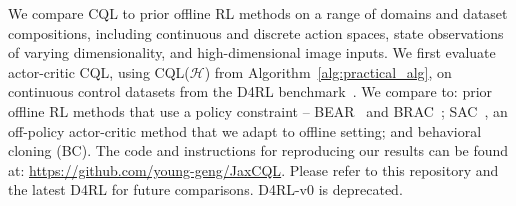 We compare CQL to prior offline RL methods on a range of domains and dataset compositions, including continuous and discrete action spaces, state observations of varying dimensionality, and high-dimensional image inputs. We first evaluate actor-critic CQL, using CQL($\mathcal{H}$) from Algorithm~\ref{alg:practical_alg}, on continuous control datasets from the D4RL benchmark~\citep{d4rl}.
We compare to: prior offline RL methods that use a policy constraint -- BEAR~\citep{kumar2019stabilizing} and BRAC~\citep{wu2019behavior}; SAC~\citep{haarnoja}, an off-policy actor-critic method that we adapt to offline setting; and behavioral cloning (BC). {The code and instructions for reproducing our results can be found at: \url{https://github.com/young-geng/JaxCQL}. Please refer to this repository and the latest D4RL for future comparisons. D4RL-v0 is deprecated.}


